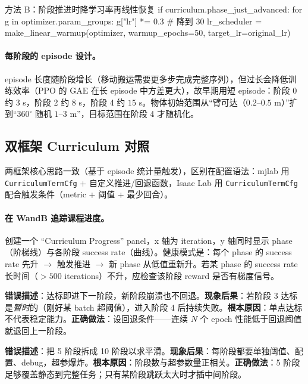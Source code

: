 \begin{codebox}[Python]{方法 B：阶段推进时降学习率再线性恢复}
if curriculum.phase_just_advanced:
    for g in optimizer.param_groups:
        g["lr"] *= 0.3                       # 降到 30%
    lr_scheduler = make_linear_warmup(optimizer, warmup_epochs=50, target_lr=original_lr)
\end{codebox}

\paragraph{每阶段的 episode 设计。}episode 长度随阶段增长（移动搬运需要更多步完成完整序列），但过长会降低训练效率（PPO 的 GAE 在长 episode 中方差更大），故早期用短 episode：阶段 0 约 $3$ s，阶段 2 约 $8$ s，阶段 4 约 $15$ s。物体初始范围从“臂可达（$0.2$--$0.5$ m）”扩到“$360^\circ$ 随机 $1$--$3$ m”，目标范围在阶段 4 才随机化。

\subsection{双框架 Curriculum 对照}
\label{sec:rlmc-wh-curr-api}

两框架核心思路一致（基于 episode 统计量触发），区别在配置语法：mjlab 用 \verb|CurriculumTermCfg| + 自定义推进/回退函数，Isaac Lab 用 \verb|CurriculumTermCfg| 配合触发条件（metric + 阈值 + 最少回合）。

\paragraph{在 WandB 追踪课程进度。}创建一个 “Curriculum Progress” panel，x 轴为 iteration，y 轴同时显示 phase（阶梯线）与各阶段 success rate（曲线）。健康模式是：每个 phase 的 success rate 先升 $\to$ 触发推进 $\to$ 新 phase 从低值重新升。若某 phase 的 success rate 长时间（$>500$ iterations）不升，应检查该阶段 reward 是否有梯度信号。

\begin{pitfall}[阶段推进不可逆]
\textbf{错误描述}：达标即进下一阶段，新阶段崩溃也不回退。\textbf{现象后果}：若阶段 3 达标是\emph{暂时}的（刚好某 batch 超阈值），进入阶段 4 后持续失败。\textbf{根本原因}：单点达标不代表稳定能力。\textbf{正确做法}：设回退条件——连续 $N$ 个 epoch 性能低于回退阈值就退回上一阶段。
\end{pitfall}

\begin{pitfall}
\textbf{错误描述}：把 5 阶段拆成 10 阶段以求平滑。\textbf{现象后果}：每阶段都要单独阈值、配置、debug，超参爆炸。\textbf{根本原因}：阶段数与超参数量正相关。\textbf{正确做法}：5 阶段足够覆盖静态到完整任务；只有某阶段跳跃太大时才插中间阶段。
\end{pitfall}

